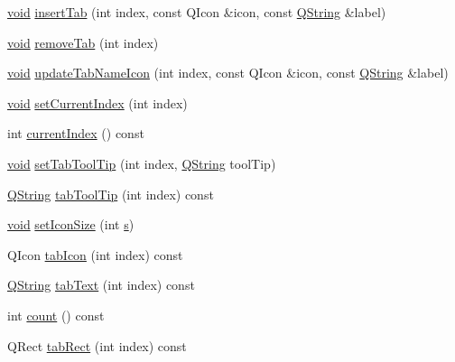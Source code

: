 \begin{DoxyCompactItemize}
\item 
\hyperlink{group___u_a_v_objects_plugin_ga444cf2ff3f0ecbe028adce838d373f5c}{void} \hyperlink{group___core_plugin_gaca91c882df5cac0ebb8cc47ed7dab0f8}{insert\-Tab} (int index, const \-Q\-Icon \&icon, const \hyperlink{group___u_a_v_objects_plugin_gab9d252f49c333c94a72f97ce3105a32d}{\-Q\-String} \&label)
\item 
\hyperlink{group___u_a_v_objects_plugin_ga444cf2ff3f0ecbe028adce838d373f5c}{void} \hyperlink{group___core_plugin_gaf4a1b5707a90c73e3bdb7dbbaf77d86a}{remove\-Tab} (int index)
\item 
\hyperlink{group___u_a_v_objects_plugin_ga444cf2ff3f0ecbe028adce838d373f5c}{void} \hyperlink{group___core_plugin_ga2395ca4b2340f7f5e54d4fada4e0e929}{update\-Tab\-Name\-Icon} (int index, const \-Q\-Icon \&icon, const \hyperlink{group___u_a_v_objects_plugin_gab9d252f49c333c94a72f97ce3105a32d}{\-Q\-String} \&label)
\item 
\hyperlink{group___u_a_v_objects_plugin_ga444cf2ff3f0ecbe028adce838d373f5c}{void} \hyperlink{group___core_plugin_gabf70f3132174e9d8c21315e2684150de}{set\-Current\-Index} (int index)
\item 
int \hyperlink{group___core_plugin_ga4616dd0bc8b0ff81cd79c83c9a713e3e}{current\-Index} () const 
\item 
\hyperlink{group___u_a_v_objects_plugin_ga444cf2ff3f0ecbe028adce838d373f5c}{void} \hyperlink{group___core_plugin_gacdb64539fcc17c999349bfc1af98f66a}{set\-Tab\-Tool\-Tip} (int index, \hyperlink{group___u_a_v_objects_plugin_gab9d252f49c333c94a72f97ce3105a32d}{\-Q\-String} tool\-Tip)
\item 
\hyperlink{group___u_a_v_objects_plugin_gab9d252f49c333c94a72f97ce3105a32d}{\-Q\-String} \hyperlink{group___core_plugin_ga3f18cabada7a29855070e6a49d684997}{tab\-Tool\-Tip} (int index) const 
\item 
\hyperlink{group___u_a_v_objects_plugin_ga444cf2ff3f0ecbe028adce838d373f5c}{void} \hyperlink{group___core_plugin_gafe9a2d6fdb7ecd3eb6be77cbfbcec6ce}{set\-Icon\-Size} (int \hyperlink{uavobjecttemplate_8m_a3691308f2a4c2f6983f2880d32e29c84}{s})
\item 
\-Q\-Icon \hyperlink{group___core_plugin_gae277615a992118760cb76176dbfa2e81}{tab\-Icon} (int index) const 
\item 
\hyperlink{group___u_a_v_objects_plugin_gab9d252f49c333c94a72f97ce3105a32d}{\-Q\-String} \hyperlink{group___core_plugin_ga3dbe2e5ffcd731a16768adc3fd471191}{tab\-Text} (int index) const 
\item 
int \hyperlink{group___core_plugin_gafef795e24cd663b07318620524a957da}{count} () const 
\item 
\-Q\-Rect \hyperlink{group___core_plugin_ga73860a10ee1c7ab8ecc257d227287058}{tab\-Rect} (int index) const 
\end{DoxyCompactItemize}


